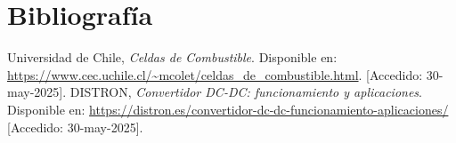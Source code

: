 \section{Bibliografía}



\begin{references}
    Universidad de Chile, \textit{Celdas de Combustible}. 
    Disponible en: \url{https://www.cec.uchile.cl/~mcolet/celdas_de_combustible.html}. [Accedido: 30-may-2025].
    DISTRON, \textit{Convertidor DC-DC: funcionamiento y aplicaciones}. 
    Disponible en: \url{https://distron.es/convertidor-dc-dc-funcionamiento-aplicaciones/} [Accedido: 30-may-2025].
\end{references}

